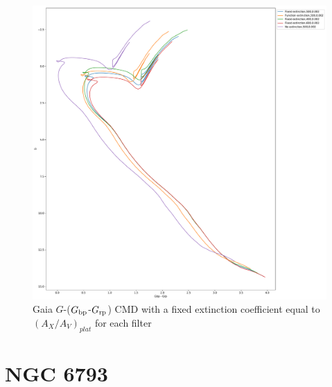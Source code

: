 \documentclass[12pt, a4paper]{report}
\begin{document}
\begin{figure}[h]
\begin{center}
\includegraphics[scale=0.3]{../basti_isochrones_10_13Gyr/Extinction_T50k_FeH0fix_func_G_GbpmGrp_500_400_600_Myr_FeH_0p002_ref_noext_Av_1p0.pdf}
\caption{Gaia $G$-($G_{\textnormal{bp}}$-$G_{\textnormal{rp}}$) CMD with a fixed extinction coefficient equal to $(A_{X}/A_{V})_{plat}$ for each filter}
\label{gaia_isoc_T50k}
\end{center}
\end{figure}

\section{NGC 6793}
\end{document}
